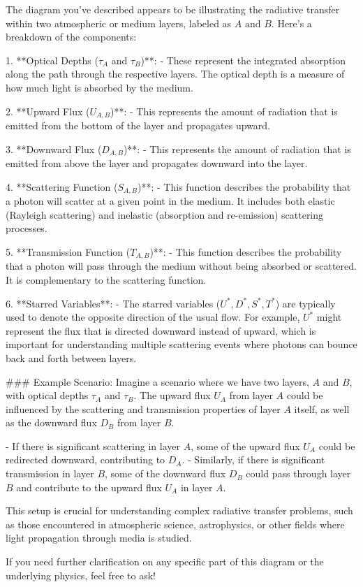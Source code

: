 The diagram you've described appears to be illustrating the radiative transfer within two atmospheric or medium layers, labeled as \(A\) and \(B\). Here's a breakdown of the components:

1. **Optical Depths (\(\tau_A\) and \(\tau_B\))**:
   - These represent the integrated absorption along the path through the respective layers. The optical depth is a measure of how much light is absorbed by the medium.

2. **Upward Flux (\(U_{A,B}\))**:
   - This represents the amount of radiation that is emitted from the bottom of the layer and propagates upward.

3. **Downward Flux (\(D_{A,B}\))**:
   - This represents the amount of radiation that is emitted from above the layer and propagates downward into the layer.

4. **Scattering Function (\(S_{A,B}\))**:
   - This function describes the probability that a photon will scatter at a given point in the medium. It includes both elastic (Rayleigh scattering) and inelastic (absorption and re-emission) scattering processes.

5. **Transmission Function (\(T_{A,B}\))**:
   - This function describes the probability that a photon will pass through the medium without being absorbed or scattered. It is complementary to the scattering function.

6. **Starred Variables**:
   - The starred variables (\(U^*, D^*, S^*, T^*\)) are typically used to denote the opposite direction of the usual flow. For example, \(U^*\) might represent the flux that is directed downward instead of upward, which is important for understanding multiple scattering events where photons can bounce back and forth between layers.

### Example Scenario:
Imagine a scenario where we have two layers, \(A\) and \(B\), with optical depths \(\tau_A\) and \(\tau_B\). The upward flux \(U_A\) from layer \(A\) could be influenced by the scattering and transmission properties of layer \(A\) itself, as well as the downward flux \(D_B\) from layer \(B\).

- If there is significant scattering in layer \(A\), some of the upward flux \(U_A\) could be redirected downward, contributing to \(D_A\).
- Similarly, if there is significant transmission in layer \(B\), some of the downward flux \(D_B\) could pass through layer \(B\) and contribute to the upward flux \(U_A\) in layer \(A\).

This setup is crucial for understanding complex radiative transfer problems, such as those encountered in atmospheric science, astrophysics, or other fields where light propagation through media is studied.

If you need further clarification on any specific part of this diagram or the underlying physics, feel free to ask!